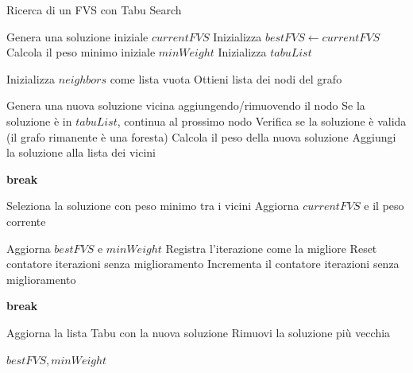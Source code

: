 \documentclass[a4paper, 10pt]{article}
\begin{document}
\begin{algorithm}[H]
\caption{Ricerca di un FVS con Tabu Search} \label{proc:find_fvs_tabu}
\begin{algorithmic}[2]
        \State Genera una soluzione iniziale $currentFVS$
        \State Inizializza $bestFVS \gets currentFVS$
        \State Calcola il peso minimo iniziale $minWeight$
        \State Inizializza $tabuList$

            \State Inizializza $neighbors$ come lista vuota
            \State Ottieni lista dei nodi del grafo
            
                \State Genera una nuova soluzione vicina aggiungendo/rimuovendo il nodo
                \State Se la soluzione è in $tabuList$, continua al prossimo nodo
                \State Verifica se la soluzione è valida (il grafo rimanente è una foresta)
                    \State Calcola il peso della nuova soluzione
                    \State Aggiungi la soluzione alla lista dei vicini
                \EndIf
            \EndFor
            
                \State \textbf{break} 
            \EndIf

            \State Seleziona la soluzione con peso minimo tra i vicini
            \State Aggiorna $currentFVS$ e il peso corrente
            
                \State Aggiorna $bestFVS$ e $minWeight$
                \State Registra l'iterazione come la migliore
                \State Reset contatore iterazioni senza miglioramento
            \Else
                \State Incrementa il contatore iterazioni senza miglioramento
            \EndIf
            
                \State \textbf{break} 
            \EndIf

            \State Aggiorna la lista Tabu con la nuova soluzione
                \State Rimuovi la soluzione più vecchia
            \EndIf
        
        \EndFor

        \State \Return $bestFVS, minWeight$
    \EndProcedure
\end{algorithmic}
\end{algorithm}
\end{document}
